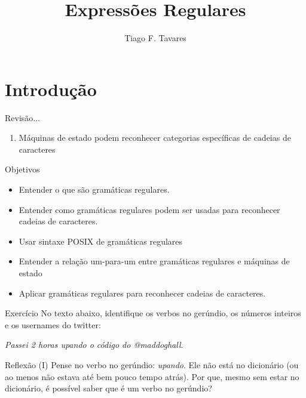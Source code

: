 \documentclass{beamer}
\title[04-Expressões Regulares]{Expressões Regulares}
\author{Tiago F. Tavares}
\institute{FEEC -- UNICAMP}
\date{}
\begin{document}
\begin{frame}
  \titlepage
\end{frame}


\section{Introdução}

\begin{frame}{Revisão...}
  \Large
  \begin{enumerate}
  \item Máquinas de estado podem reconhecer categorias específicas de cadeias de
    caracteres
  \end{enumerate}
\end{frame}

\begin{frame}{Objetivos}
  \Large
  \begin{itemize}
  \item Entender o que são gramáticas regulares.
  \item Entender como gramáticas regulares podem ser usadas para reconhecer
    cadeias de caracteres.
  \item Usar sintaxe POSIX de gramáticas regulares
  \item Entender a relação um-para-um entre gramáticas regulares e máquinas de
  estado
  \item Aplicar gramáticas regulares para reconhecer cadeias de caracteres.
  \end{itemize}
\end{frame}

\begin{frame}{Exercício}
  \centering
  No texto abaixo, identifique os verbos no gerúndio, os números inteiros e os
  usernames do twitter:

  \vspace{0.5in}

  \textit{Passei 2 horas upando o código do @maddoghall}.
\end{frame}

\begin{frame}{Reflexão (I)}
  \centering
  \Large
  Pense no verbo no gerúndio: \textit{upando}. Ele não está no dicionário (ou ao
  menos não estava até bem pouco tempo atrás). Por que, mesmo sem estar no
  dicionário, é possível saber que é um verbo no gerúndio?
\end{frame}
\end{document}
